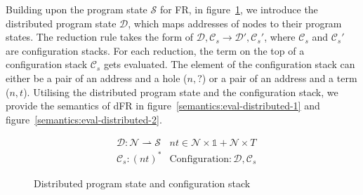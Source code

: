 Building upon the program state $\mathcal{S}$ for FR, in figure~\ref{d-state}, we introduce the distributed program state $\mathcal{D}$, which maps addresses of nodes to their program states. The reduction rule takes the form of $\mathcal{D}, \mathcal{C}_s \longrightarrow \mathcal{D'}, \mathcal{C}_s'$, where $\mathcal{C}_s$ and $\mathcal{C}_s'$ are configuration stacks. For each reduction, the term on the top of a configuration stack $\mathcal{C}_s$ gets evaluated. The element of the configuration stack can either be a pair of an address and a hole ($n, ?$) or a pair of an address and a term ($n, t$). Utilising the distributed program state and the configuration stack, we provide the semantics of dFR in figure~\ref{semantics:eval-distributed-1} and figure~\ref{semantics:eval-distributed-2}.
\begin{figure}
    \begin{align*}
        &\mathcal{D}: \mathcal{N} \rightharpoonup \mathcal{S}
        &\mathit{nt} \in  \mathcal{N} \times\mathds{1} + \mathcal{N}\times T\\
        &\mathcal{C}_s : (nt)^*
        &\mathrm{Configuration}: \mathcal{D}, \mathcal{C}_s
    \end{align*}
    \caption{Distributed program state and configuration stack}
    \label{d-state}
\end{figure}

